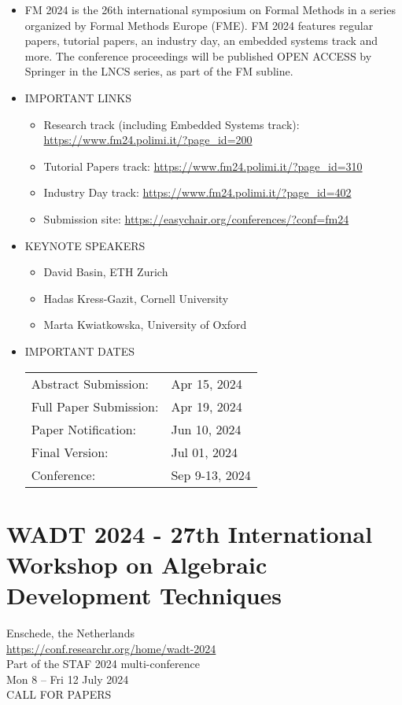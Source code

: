 \documentclass[prodmode,acmtecs]{acmsmall} %
\begin{document}
\begin{itemize}\item  FM 2024 is the 26th international symposium on Formal Methods in a series organized by Formal Methods Europe (FME). FM 2024 features regular papers, tutorial papers, an industry day, an embedded systems track and more. The conference proceedings will be published OPEN ACCESS by Springer in the LNCS series, as part of the FM subline. 
 
\item  IMPORTANT LINKS 
 
\begin{itemize}\item  Research track (including Embedded Systems track): \href{https://www.fm24.polimi.it/?page_id=200}{https://www.fm24.polimi.it/?page\_id=200}
\item  Tutorial Papers track: \href{https://www.fm24.polimi.it/?page_id=310}{https://www.fm24.polimi.it/?page\_id=310}
\item  Industry Day track: \href{https://www.fm24.polimi.it/?page_id=402}{https://www.fm24.polimi.it/?page\_id=402}
\item  Submission site: \href{https://easychair.org/conferences/?conf=fm24}{https://easychair.org/conferences/?conf=fm24}
\end{itemize} 
\item  KEYNOTE SPEAKERS 
 
\begin{itemize}\item  David Basin, ETH Zurich
\item  Hadas Kress-Gazit, Cornell University
\item  Marta Kwiatkowska, University of Oxford
\end{itemize} 
\item  IMPORTANT DATES 
 
\begin{tabulary}{\linewidth}{LL}Abstract Submission:  & Apr 15, 2024 \\
Full Paper Submission:  & Apr 19, 2024 \\
Paper Notification:  & Jun 10, 2024 \\
Final Version:  & Jul 01, 2024 \\
Conference:  & Sep 9-13, 2024 \\
\end{tabulary}
 
\end{itemize}\section{WADT 2024 - 27th International Workshop on Algebraic Development Techniques}\label{WADT202427thInternationalWorkshoponAlgebraicDevelopmentTechniques}  Enschede, the Netherlands\\ 
  \href{https://conf.researchr.org/home/wadt-2024}{https://conf.researchr.org/home/wadt-2024}\\ 
  Part of the STAF 2024 multi-conference\\ 
  Mon 8 – Fri 12 July 2024\\ 
CALL FOR PAPERS 
\end{document}
